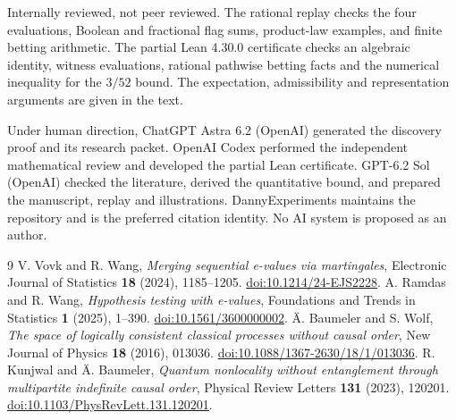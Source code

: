 \documentclass[11pt,a4paper]{amsart}
\begin{document}
Internally reviewed, not peer reviewed. The rational replay checks
the four evaluations, Boolean and fractional flag sums, product-law
examples, and finite betting arithmetic. The partial Lean 4.30.0
certificate checks an algebraic identity, witness evaluations,
rational pathwise betting facts and the numerical inequality for
the \(3/52\) bound. The expectation, admissibility and representation
arguments are given in the text.

Under human direction, ChatGPT Astra 6.2 (OpenAI) generated the
discovery proof and its research packet. OpenAI Codex performed
the independent mathematical review and developed the partial
Lean certificate. GPT-6.2 Sol (OpenAI) checked the literature,
derived the quantitative bound, and prepared the manuscript,
replay and illustrations. DannyExperiments maintains the repository
and is the preferred citation identity. No AI system is proposed
as an author.

\begin{thebibliography}{9}
V. Vovk and R. Wang, \emph{Merging sequential e-values via martingales},
Electronic Journal of Statistics \textbf{18} (2024), 1185--1205.
\href{https://doi.org/10.1214/24-EJS2228}{doi:10.1214/24-EJS2228}.
A. Ramdas and R. Wang, \emph{Hypothesis testing with e-values},
Foundations and Trends in Statistics \textbf{1} (2025), 1--390.
\href{https://doi.org/10.1561/3600000002}{doi:10.1561/3600000002}.
\"A. Baumeler and S. Wolf,
\emph{The space of logically consistent classical processes without
causal order}, New Journal of Physics \textbf{18} (2016), 013036.
\href{https://doi.org/10.1088/1367-2630/18/1/013036}{doi:10.1088/1367-2630/18/1/013036}.
R. Kunjwal and \"A. Baumeler,
\emph{Quantum nonlocality without entanglement through multipartite
indefinite causal order}, Physical Review Letters \textbf{131}
(2023), 120201.
\href{https://doi.org/10.1103/PhysRevLett.131.120201}{doi:10.1103/PhysRevLett.131.120201}.
\end{thebibliography}
\end{document}
